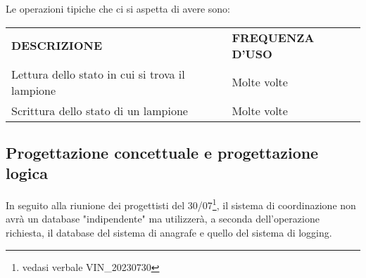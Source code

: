 Le operazioni tipiche che ci si aspetta di avere sono:

\begin{center}
    \begin{tabularx}{\textwidth}{|l|X|}
        \hline
        \rowcolor{gray!30}
        \multicolumn{2}{|c|}{\textbf{OPERAZIONI TIPICHE}}
        \\
        \hline
        \rowcolor{gray!30}
        \textbf{{DESCRIZIONE}} & \textbf{{FREQUENZA D'USO}} \\
        \hline
        Lettura dello stato in cui si trova il lampione & Molte volte \\
        \hline
        Scrittura dello stato di un lampione & Molte volte\\
        \hline
    \end{tabularx}
\end{center}

\subsection{Progettazione concettuale e progettazione logica}

In seguito alla riunione dei progettisti del 30/07\footnote{vedasi verbale VIN\_20230730}, il sistema di coordinazione non avrà un database "indipendente" ma utilizzerà, a seconda dell'operazione richiesta, il database del sistema di anagrafe e quello del sistema di logging.